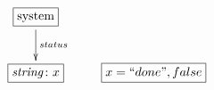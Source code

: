 $\xymatrix{
  \fbox{system} \ar[d]^{status} \\
  \fbox{$\mathit{string}\colon x$} & \fbox{$x = ``done", false$}
}$
